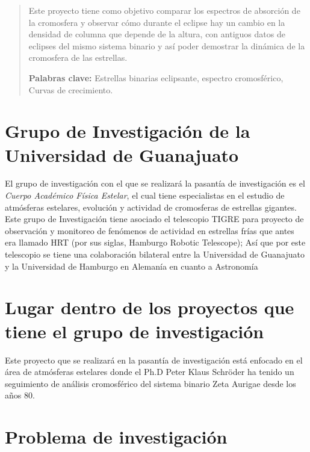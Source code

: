 \documentclass[11pt]{article}
\begin{document}
\newpage
\begin{abstract}
Este proyecto tiene como objetivo comparar los espectros de absorción de la cromosfera y observar cómo durante el eclipse hay un cambio en la densidad de columna que depende de la altura, con antiguos datos de eclipses del mismo sistema binario y así poder demostrar la dinámica de la cromosfera de las estrellas.

\vspace{0.5cm}
\textbf{Palabras clave:} Estrellas binarias eclipsante, espectro cromosférico, Curvas de crecimiento.

\end{abstract}


\begin{figure}
  \centering

  \label{Figura 1}
\end{figure}


\section{Grupo de Investigación de la Universidad de Guanajuato}
El grupo de investigación con el que se realizará la pasantía de investigación es el \textit{Cuerpo Académico Física Estelar}, el cual tiene especialistas en el estudio de atmósferas estelares, evolución y actividad de cromosferas de estrellas gigantes. Este grupo de Investigación tiene asociado el telescopio TIGRE para proyecto de observación y monitoreo de fenómenos de actividad en estrellas frías que antes era llamado HRT (por sus siglas, Hamburgo Robotic Telescope); Así que por este telescopio se tiene una colaboración bilateral entre la Universidad de Guanajuato y la Universidad de Hamburgo en Alemanía en cuanto a Astronomía

\section{Lugar dentro de los proyectos que tiene el grupo de investigación}
\noindent Este proyecto que se realizará en la pasantía de investigación está enfocado en el área de atmósferas estelares donde el Ph.D Peter Klaus Schröder ha tenido un seguimiento de análisis cromosférico del sistema binario Zeta Aurigae desde los años 80.
\section{Problema de investigación}
\end{document}
